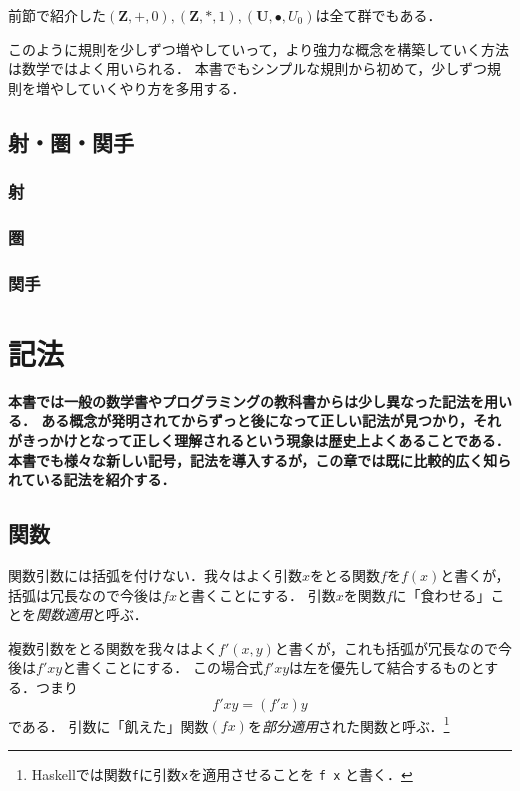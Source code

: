 \documentclass[twocolumn]{jsbook}
\newcommand{\keyword}[1]{\emph{#1}}
\newcommand{\code}[1]{\texttt{#1}}
\newenvironment{leader}{\begingroup\bf}{\endgroup}
\newcommand{\mathsetname}[1]{\boldsymbol{#1}}
\newcommand{\mathtriple}[3]{(#1,#2,#3)}
\newcommand{\mathcompose}{\bullet}
\begin{document}
前節で紹介した$\mathtriple{\mathsetname{Z}}{+}{0},\mathtriple{\mathsetname{Z}}{*}{1},\mathtriple{\mathsetname{U}}{\mathcompose}{U_0}$は全て群でもある．

このように規則を少しずつ増やしていって，より強力な概念を構築していく方法は数学ではよく用いられる．
本書でもシンプルな規則から初めて，少しずつ規則を増やしていくやり方を多用する．


\section{射・圏・関手}

\subsection{射}
\subsection{圏}
\subsection{関手}


\chapter{記法}

\begin{leader}
本書では一般の数学書やプログラミングの教科書からは少し異なった記法を用いる．
ある概念が発明されてからずっと後になって正しい記法が見つかり，それがきっかけとなって正しく理解されるという現象は歴史上よくあることである．
本書でも様々な新しい記号，記法を導入するが，この章では既に比較的広く知られている記法を紹介する．
\end{leader}


\section{関数}

関数引数には括弧を付けない．我々はよく引数$x$をとる関数$f$を$f(x)$と書くが，括弧は冗長なので今後は$fx$と書くことにする．
引数$x$を関数$f$に「食わせる」ことを\keyword{関数適用}と呼ぶ．

複数引数をとる関数を我々はよく$f'(x,y)$と書くが，これも括弧が冗長なので今後は$f'xy$と書くことにする．
この場合式$f'xy$は左を優先して結合するものとする．つまり$$f'xy=(f'x)y$$である．
引数に「飢えた」関数$(fx)$を\keyword{部分適用}された関数と呼ぶ．\footnote{Haskellでは関数\code{f}に引数\code{x}を適用させることを \code{f x} と書く．}
\end{document}
